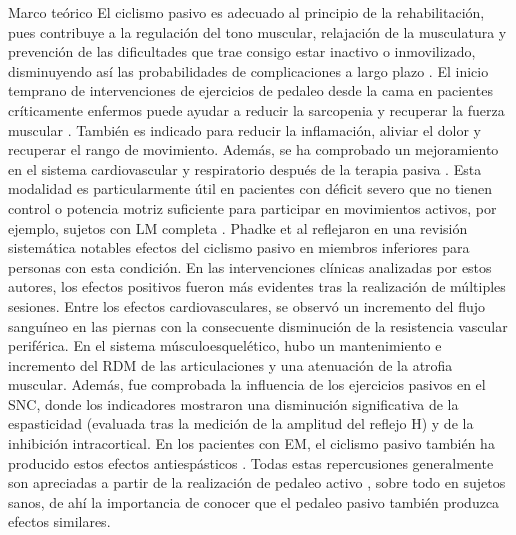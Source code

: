 \begin{thesischapter}{1} {Marco teórico}
    \vspace{5pt}
    El ciclismo pasivo es adecuado al principio de la rehabilitación, pues contribuye a la
    regulación del tono muscular, relajación de la musculatura y prevención de las dificultades
    que trae consigo estar inactivo o inmovilizado, disminuyendo así las probabilidades de
    complicaciones a largo plazo \cite{cruz2009guia}. El inicio temprano de intervenciones de ejercicios de
    pedaleo desde la cama en pacientes críticamente enfermos puede ayudar a reducir la
    sarcopenia y recuperar la fuerza muscular \cite{nickels2020acceptability}. También es indicado para reducir la
    inflamación, aliviar el dolor y recuperar el rango de movimiento. Además, se ha
    comprobado un mejoramiento en el sistema cardiovascular y respiratorio después de la
    terapia pasiva \cite{cruz2009guia, phadke2019impact}.
    Esta modalidad es particularmente útil en pacientes con déficit severo que no tienen
    control o potencia motriz suficiente para participar en movimientos activos, por ejemplo,
    sujetos con LM completa \cite{phadke2019impact, nardone2017passive}. Phadke et al \cite{phadke2019impact} reflejaron en una revisión sistemática
    notables efectos del ciclismo pasivo en miembros inferiores para personas con esta
    condición. En las intervenciones clínicas analizadas por estos autores, los efectos
    positivos fueron más evidentes tras la realización de múltiples sesiones. Entre los efectos
    cardiovasculares, se observó un incremento del flujo sanguíneo en las piernas con la
    consecuente disminución de la resistencia vascular periférica. En el sistema
    músculoesquelético, hubo un mantenimiento e incremento del RDM de las articulaciones
    y una atenuación de la atrofia muscular. Además, fue comprobada la influencia de los
    ejercicios pasivos en el SNC, donde los indicadores mostraron una disminución
    significativa de la espasticidad (evaluada tras la medición de la amplitud del reflejo H) y
    de la inhibición intracortical. En los pacientes con EM, el ciclismo pasivo también ha
    producido estos efectos antiespásticos \cite{motl2006effect, guyot2012effects}. Todas estas repercusiones generalmente
    son apreciadas a partir de la realización de pedaleo activo \cite{nardone2016effects}, sobre todo en sujetos
    sanos, de ahí la importancia de conocer que el pedaleo pasivo también produzca efectos
    similares.


\end{thesischapter}

